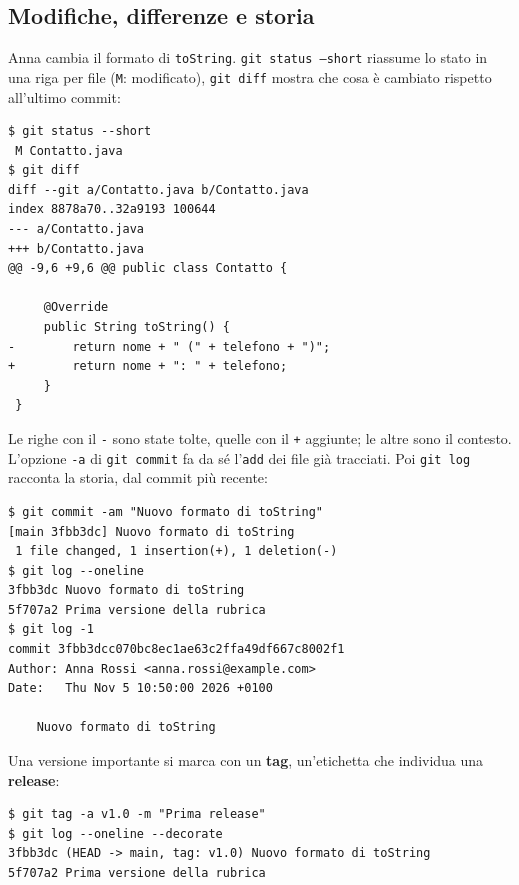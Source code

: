 \subsection{Modifiche, differenze e storia}

Anna cambia il formato di \texttt{toString}. \texttt{git status --short} riassume lo stato in una riga per file
(\texttt{M}: modificato), \texttt{git diff} mostra che cosa è cambiato rispetto all'ultimo commit:

\begin{lstlisting}[style=shell, name=Terminale di Anna, deletekeywords={java}]
$ git status --short
 M Contatto.java
$ git diff
diff --git a/Contatto.java b/Contatto.java
index 8878a70..32a9193 100644
--- a/Contatto.java
+++ b/Contatto.java
@@ -9,6 +9,6 @@ public class Contatto {

     @Override
     public String toString() {
-        return nome + " (" + telefono + ")";
+        return nome + ": " + telefono;
     }
 }
\end{lstlisting}

Le righe con il \texttt{-} sono state tolte, quelle con il \texttt{+} aggiunte; le altre sono il contesto.
L'opzione \texttt{-a} di \texttt{git commit} fa da sé l'\texttt{add} dei file già tracciati. Poi \texttt{git log}
racconta la storia, dal commit più recente:

\begin{lstlisting}[style=shell, name=Terminale di Anna, deletekeywords={java}]
$ git commit -am "Nuovo formato di toString"
[main 3fbb3dc] Nuovo formato di toString
 1 file changed, 1 insertion(+), 1 deletion(-)
$ git log --oneline
3fbb3dc Nuovo formato di toString
5f707a2 Prima versione della rubrica
$ git log -1
commit 3fbb3dcc070bc8ec1ae63c2ffa49df667c8002f1
Author: Anna Rossi <anna.rossi@example.com>
Date:   Thu Nov 5 10:50:00 2026 +0100

    Nuovo formato di toString
\end{lstlisting}

Una versione importante si marca con un \textbf{tag}, un'etichetta che individua una \textbf{release}:

\begin{lstlisting}[style=shell, name=Terminale di Anna, deletekeywords={java}]
$ git tag -a v1.0 -m "Prima release"
$ git log --oneline --decorate
3fbb3dc (HEAD -> main, tag: v1.0) Nuovo formato di toString
5f707a2 Prima versione della rubrica
\end{lstlisting}

